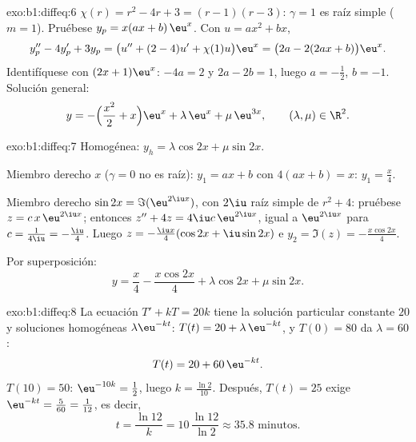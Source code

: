 \begin{solution}{exo:b1:diffeq:6}
$\chi(r) = r^2 - 4r + 3 = (r-1)(r-3)$: $\gamma = 1$ es raíz simple
($m = 1$). Pruébese $y_p = x(ax + b)\,\eu^x$. Con $u = ax^2 + bx$,
\[
y_p'' - 4y_p' + 3y_p = \bigl(u'' + (2 - 4)u' + \chi(1) u\bigr)\eu^x
= \bigl(2a - 2(2ax + b)\bigr)\eu^x .
\]
Identifíquese con $(2x + 1)\eu^x$: $-4a = 2$ y $2a - 2b = 1$, luego
$a = -\frac12$, $b = -1$. Solución general:
\[
y = -\Bigl(\frac{x^2}{2} + x\Bigr)\eu^{x} + \lambda\,\eu^{x} +
\mu\,\eu^{3x}, \qquad (\lambda, \mu) \in \R^2 .
\]
\end{solution}

\begin{solution}{exo:b1:diffeq:7}
Homogénea: $y_h = \lambda\cos 2x + \mu\sin 2x$.

Miembro derecho $x$ ($\gamma = 0$ no es raíz): $y_1 = ax + b$ con
$4(ax + b) = x$: $y_1 = \frac x4$.

Miembro derecho $\sin 2x = \Im(\eu^{2\iu x})$, con $2\iu$ raíz simple
de $r^2 + 4$: pruébese $z = c\,x\,\eu^{2\iu x}$; entonces
$z'' + 4z = 4\iu c\,\eu^{2\iu x}$, igual a $\eu^{2\iu x}$ para
$c = \frac{1}{4\iu} = -\frac{\iu}{4}$. Luego $z = -\frac{\iu x}{4}(\cos 2x +
\iu \sin 2x)$ e $y_2 = \Im(z) = -\frac{x\cos 2x}{4}$.

Por superposición:
\[
y = \frac{x}{4} - \frac{x\cos 2x}{4} + \lambda\cos 2x + \mu\sin 2x .
\]
\end{solution}

\begin{solution}{exo:b1:diffeq:8}
La ecuación $T' + kT = 20k$ tiene la solución particular constante $20$
y soluciones homogéneas $\lambda\eu^{-kt}$: $T(t) = 20 +
\lambda\,\eu^{-kt}$, y $T(0) = 80$ da $\lambda = 60$:
\[
T(t) = 20 + 60\,\eu^{-kt} .
\]
$T(10) = 50$: $\eu^{-10k} = \frac12$, luego $k = \frac{\ln 2}{10}$.
Después, $T(t) = 25$ exige $\eu^{-kt} = \frac{5}{60} = \frac{1}{12}$, es decir,
\[
t = \frac{\ln 12}{k} = 10\,\frac{\ln 12}{\ln 2} \approx 35.8
\text{ minutos.}
\]
\end{solution}

